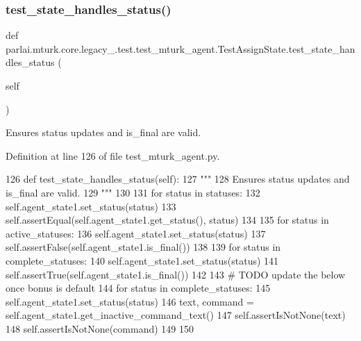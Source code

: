 \subsubsection{\texorpdfstring{test\+\_\+state\+\_\+handles\+\_\+status()}{test\_state\_handles\_status()}}
{\footnotesize\ttfamily def parlai.\+mturk.\+core.\+legacy\+\_.\+test.\+test\+\_\+mturk\+\_\+agent.\+Test\+Assign\+State.\+test\+\_\+state\+\_\+handles\+\_\+status (\begin{DoxyParamCaption}\item[{}]{self }\end{DoxyParamCaption})}

\begin{DoxyVerb}Ensures status updates and is_final are valid.
\end{DoxyVerb}
 

Definition at line 126 of file test\+\_\+mturk\+\_\+agent.\+py.


\begin{DoxyCode}
126     \textcolor{keyword}{def }test\_state\_handles\_status(self):
127         \textcolor{stringliteral}{"""}
128 \textcolor{stringliteral}{        Ensures status updates and is\_final are valid.}
129 \textcolor{stringliteral}{        """}
130 
131         \textcolor{keywordflow}{for} status \textcolor{keywordflow}{in} statuses:
132             self.agent\_state1.set\_status(status)
133             self.assertEqual(self.agent\_state1.get\_status(), status)
134 
135         \textcolor{keywordflow}{for} status \textcolor{keywordflow}{in} active\_statuses:
136             self.agent\_state1.set\_status(status)
137             self.assertFalse(self.agent\_state1.is\_final())
138 
139         \textcolor{keywordflow}{for} status \textcolor{keywordflow}{in} complete\_statuses:
140             self.agent\_state1.set\_status(status)
141             self.assertTrue(self.agent\_state1.is\_final())
142 
143         \textcolor{comment}{# TODO update the below once bonus is default}
144         \textcolor{keywordflow}{for} status \textcolor{keywordflow}{in} complete\_statuses:
145             self.agent\_state1.set\_status(status)
146             text, command = self.agent\_state1.get\_inactive\_command\_text()
147             self.assertIsNotNone(text)
148             self.assertIsNotNone(command)
149 
150 
\end{DoxyCode}


